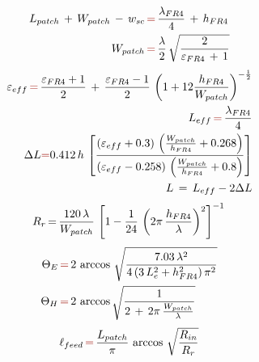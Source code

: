 \documentclass[10 pt,a4paper,twocolumn]{article}
\begin{document}
{\begin{equation}
\begin{aligned}L_{patch}\,+\,W_{patch}\,-\,w_{sc}\,&{\color{Mahogany}=}\,\frac{\lambda_{FR4}}{4}\,+\,h_{FR4}\\
	W_{patch}\,&{\color{Mahogany}=}\,\frac{\lambda}{2}\,\sqrt{\frac{2}{\varepsilon_{FR4}\,+\,1}}\\
\end{aligned}
\label{eq:patch size}
\end{equation}
\begin{equation}
\begin{aligned}
	\varepsilon_{eff}\,{\color{Mahogany}=}\,\frac{\varepsilon_{FR4}+1}{2}\,+\,\frac{\varepsilon_{FR4}-1}{2}\,\left(1+12\frac{h_{FR4}}{W_{patch}}\right)^{-\frac{1}{2}}\\
	L_{eff}\,{\color{Mahogany}=}\,\frac{\lambda_{FR4}}{4}\\
	\Delta L{\color{Mahogany}=}0.412\,h\,\left[\frac{(\varepsilon_{eff}+0.3)\,\left(\frac{W_{patch}}{h_{FR4}}+0.268\right)}{(\varepsilon_{eff}-0.258)\,\left(\frac{W_{patch}}{h_{FR4}}+0.8\right)}\right]\\
	L\,=\,L_{eff}-2\Delta L
\end{aligned}
\label{eq:patch effective}
\end{equation}
\begin{equation}
R_r\,{=}\,\frac{120\,\lambda}{W_{patch}}\,\left[1-\frac{1}{24}\,\left(2\pi\,\frac{h_{FR4}}{\lambda}\right)^{2}\right]^{-1}\\
\label{eq:radiation resistance}
\end{equation}
\begin{equation}
\begin{aligned}
	\Theta_E\,&{\color{Mahogany}=}\,2\,\arccos\,\sqrt{\frac{7.03\,\lambda^2}{4\,(3\,L_e^2+h_{FR4}^2)\,\pi^2}}\\
	\Theta_H\,&{\color{Mahogany}=}\,2\,\arccos\sqrt{\frac{1}{2\,+\,2\pi\,\frac{W_{patch}}{\lambda}}}\\
\end{aligned}
\label{eq:beamwidth EH cuts}
\end{equation}
\begin{equation}
\ell_{feed}\,{\color{Mahogany}=}\,\frac{L_{patch}}{\pi}\,\arccos\,\sqrt{\frac{R_{in}}{R_r}}
\label{eq:feed length coordinate}
\end{equation}

				
}
\end{document}
